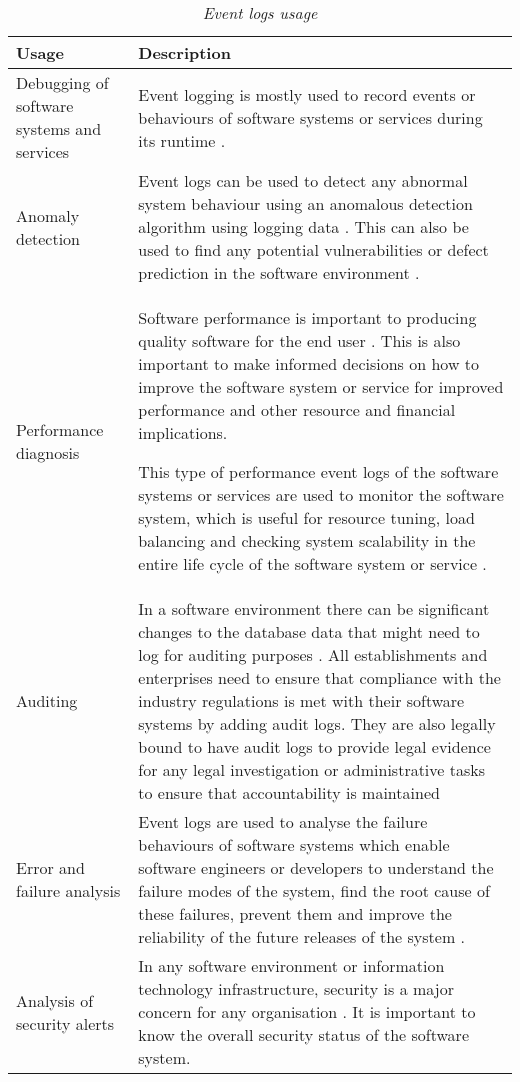 \begin{table}[!htb]
	\centering
	\caption[Event logs usage]
	{\textit{Event logs usage}}
	\label{tbl:CH1_EventLogsUsage}
	\begin{tabularx}{\textwidth}{|l|X|}
		\hline \textbf{Usage} & \textbf{Description} \\
		\hline Debugging of software systems and services & Event logging is mostly used to record events or behaviours of software systems or services during its runtime \cite{Rong2018a}.\\
		\hline Anomaly detection & Event logs can be used to detect any abnormal system behaviour using an anomalous detection algorithm using logging data \cite{Gurumdimma2016}. This can also be used to find any potential vulnerabilities or defect prediction in the software environment \cite{Dwyer2013}. \\
		\hline Performance diagnosis & Software performance is important to producing quality software for the end user \cite{EvangelinGeetha2007,Baccanico2014}. This is also important to make informed decisions on how to improve the software system or service for improved performance and other resource and financial implications.\par This type of performance event logs of the software systems or services are used to monitor the software system, which is useful for resource tuning, load balancing and checking system scalability in the entire life cycle of the software system or service \cite{Song2017}. \\ 
		\hline Auditing & In a software environment there can be significant changes to the database data that might need to log for auditing purposes \cite{Rong2018a}. All establishments and enterprises need to ensure that compliance with the industry regulations is met with their software systems by adding audit logs. They are also legally bound to have audit logs to provide legal evidence for any legal investigation or administrative tasks to ensure that accountability is maintained \\
		\hline Error and failure analysis & Event logs are used to analyse the failure behaviours of software systems which enable software engineers or developers to understand the failure modes of the system, find the root cause of these failures, prevent them and improve the reliability of the future releases of the system \cite{Cinque2013}.\\
		\hline Analysis of security alerts & In any software environment or information technology infrastructure, security is a major concern for any organisation \cite{Pathan2014, Dwyer2013}. It is important to know the overall security status of the software system. \\
		\hline
	\end{tabularx}
\end{table}

